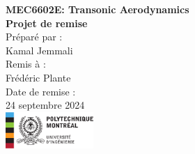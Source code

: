 \documentclass[12pt]{article}
\begin{document}
\begin{titlepage}
    \centering
    \vspace*{5cm}
    
    {\Huge \textbf{MEC6602E: Transonic Aerodynamics}}\\[1.5cm]
    
    {\Large \textbf{Projet de remise}}\\[2cm]
    
    {\Large Préparé par :}\\
    {\Large Kamal Jemmali}\\[1.5cm]
    
    {\Large Remis à :}\\
    {\Large Frédéric Plante}\\[2cm]
    
    {\Large Date de remise :}\\
    {\Large 24 septembre 2024}\\
    
    \vfill
    \includegraphics[width=0.25\textwidth]{polytechnique-signature-rgb-gauche-fr.png} %
    
    \vfill
\end{titlepage}
\end{document}
